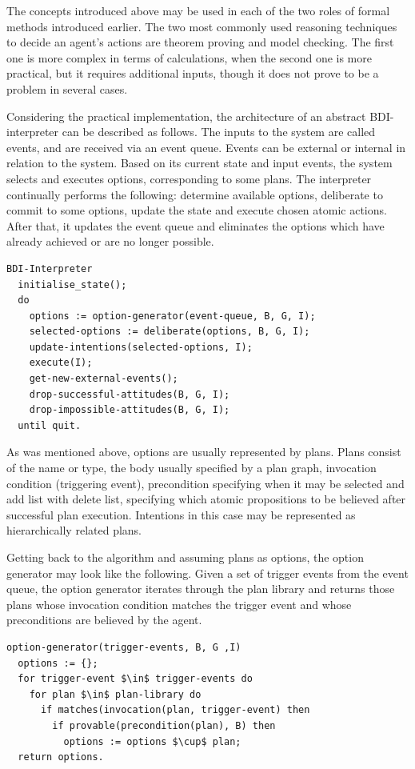 The concepts introduced above may be used in each of the two roles of formal methods introduced earlier.
The two most commonly used reasoning techniques to decide an agent's actions are theorem proving and model checking.
The first one is more complex in terms of calculations, when the second one is more practical, but it requires additional inputs, though it does not prove to be a problem in several cases.

Considering the practical implementation, the architecture of an abstract BDI-interpreter can be described as follows.
The inputs to the system are called events, and are received via an event queue.
Events can be external or internal in relation to the system.
Based on its current state and input events, the system selects and executes options, corresponding to some plans.
The interpreter continually performs the following: determine available options, deliberate to commit to some options, update the state and execute chosen atomic actions.
After that, it updates the event queue and eliminates the options which have already achieved or are no longer possible.

\begin{lstlisting}[caption={An abstract BDI interpreter~\cite{Singh_92}.}]
  BDI-Interpreter
  initialise_state();
  do
    options := option-generator(event-queue, B, G, I);
    selected-options := deliberate(options, B, G, I);
    update-intentions(selected-options, I);
    execute(I);
    get-new-external-events();
    drop-successful-attitudes(B, G, I);
    drop-impossible-attitudes(B, G, I);
  until quit.
\end{lstlisting}

As was mentioned above, options are usually represented by plans.
Plans consist of the name or type, the body usually specified by a plan graph, invocation condition (triggering event), precondition specifying when it may be selected and add list with delete list, specifying which atomic propositions to be believed after successful plan execution.
Intentions in this case may be represented as hierarchically related plans.

Getting back to the algorithm and assuming plans as options, the option generator may look like the following.
Given a set of trigger events from the event queue, the option generator iterates through the plan library and returns those plans whose invocation condition matches the trigger event and whose preconditions are believed by the agent.

\begin{lstlisting}[mathescape, caption={Option generation for a BDI interpreter~\cite{Singh_92}.}]
  option-generator(trigger-events, B, G ,I)
  options := {};
  for trigger-event $\in$ trigger-events do
    for plan $\in$ plan-library do
      if matches(invocation(plan, trigger-event) then
        if provable(precondition(plan), B) then
          options := options $\cup$ plan;
  return options.
\end{lstlisting}

